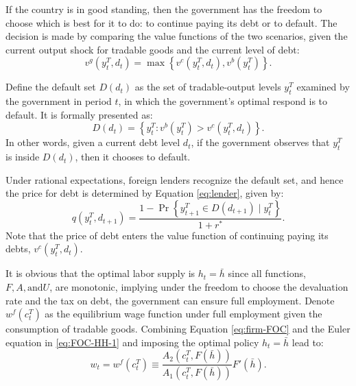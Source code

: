If the country is in good standing, then the government has the freedom to choose which is best for it to do: to continue paying its debt or to default. The decision is made by comparing the value functions of the two scenarios, given the current output shock for tradable goods and the current level of debt:
\begin{equation}
    \label{eq:vg}
    v^g(y^T_t, d_t) = \max\left\{
        v^c(y^T_t, d_t) ,
        v^b(y^T_t)
     \right\}.
\end{equation}

Define the default set $D(d_t)$ as the set of tradable-output levels $y^T_t$ examined by the government in period $t$, in which the government's optimal respond is to default.
It is formally presented as:
\begin{equation}
    \label{eq:default-set}
    D(d_t) = \left\{ 
        y^T_t : v^b(y^T_t) > v^c(y^T_t, d_t)
     \right\}.
\end{equation}
In other words, given a current debt level $d_t$, if the government observes that $y^T_t$ is inside $D(d_t)$, then it chooses to default.

Under rational expectations, foreign lenders recognize the default set, and hence the price for debt is determined by Equation \eqref{eq:lender}, given by:
\begin{equation}
    q(y^T_t, d_{t+1}) =
    \frac{1 - \Pr\left\{ y^T_{t+1} \in D(d_{t+1}) \mid y^T_t \right\}}{1 + r^*}.
\end{equation}
Note that the price of debt enters the value function of continuing paying its debts, $v^c(y^T_t, d_{t})$.

It is obvious that the optimal labor supply is $h_t = \bar{h}$ since all functions, $F, A, \text{and} U$, are monotonic, implying under the freedom to choose the devaluation rate and the tax on debt, the government can ensure full employment. Denote $w^f(c^T_t)$ as the equilibrium wage function under full employment given the consumption of tradable goods. Combining Equation \eqref{eq:firm-FOC} and the Euler equation in \eqref{eq:FOC-HH-1} and imposing the optimal policy $h_t = \bar{h}$ lead to:
\begin{equation}
    w_t = w^f(c^T_t) \equiv \frac{A_2(c^T_t, F(\bar{h}))}{A_1(c^T_t, F(\bar{h}))} F'(\bar{h}).
\end{equation}


